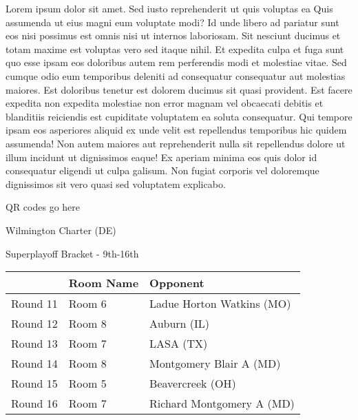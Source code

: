 \documentclass{article}%
\begin{document}
\vspace*{8pt}%
\linebreak%
\newline%
\newline%
    Lorem ipsum dolor sit amet. Sed iusto reprehenderit ut quis voluptas ea Quis assumenda ut eius magni eum voluptate modi? Id unde libero ad pariatur sunt eos nisi possimus est omnis nisi ut internos laboriosam. Sit nesciunt ducimus et totam maxime est voluptas vero sed itaque nihil. Et expedita culpa et fuga sunt quo esse ipsam eos doloribus autem rem perferendis modi et molestiae vitae.\newline%
\newline%
    Sed cumque odio eum temporibus deleniti ad consequatur consequatur aut molestias maiores. Est doloribus tenetur est dolorem ducimus sit quasi provident. Est facere expedita non expedita molestiae non error magnam vel obcaecati debitis et blanditiis reiciendis est cupiditate voluptatem ea soluta consequatur. Qui tempore ipsam eos asperiores aliquid ex unde velit est repellendus temporibus hic quidem assumenda!\newline%
\newline%
    Non autem maiores aut reprehenderit nulla sit repellendus dolore ut illum incidunt ut dignissimos eaque! Ex aperiam minima eos quis dolor id consequatur eligendi ut culpa galisum. Non fugiat corporis vel doloremque dignissimos sit vero quasi sed voluptatem explicabo.\newline%
\newline%
\vspace*{30pt}%
\begin{center}%
\begin{Huge}%
QR codes go here%
\end{Huge}%
\end{center}%
\newpage%
\begin{center}%
\begin{Huge}%
Wilmington Charter (DE)%
\end{Huge}%
\vspace*{8pt}%
\linebreak%
\begin{Large}%
Superplayoff Bracket {-} 9th{-}16th%
\end{Large}%
\end{center}%
%
\begin{tabularx}{\textwidth}{|c|Y|Y|}%
\hline%
&Room Name&Opponent\\%
\hline%
Round 11&Room 6&Ladue Horton Watkins (MO)\\%
Round 12&Room 8&Auburn (IL)\\%
Round 13&Room 7&LASA (TX)\\%
Round 14&Room 8&Montgomery Blair A (MD)\\%
Round 15&Room 5&Beavercreek (OH)\\%
Round 16&Room 7&Richard Montgomery A (MD)\\%
\hline%
\end{tabularx}%
\end{document}
